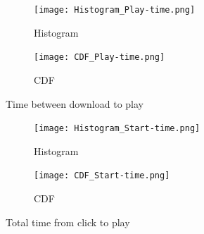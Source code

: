 \begin{figure}
\begin{subfigure}[b]{0.5\textwidth}
 	\texttt{[image: Histogram\_Play-time.png]}
  	\caption{Histogram}\label{fig:histogram3}
    \end{subfigure}\hfill 
    \hspace{3px}
    \begin{subfigure}[b]{0.5\textwidth}
	 \texttt{[image: CDF\_Play-time.png]}
 	\caption{CDF}\label{fig:cdf3}
    \end{subfigure}
	\caption{Time between download to play}
	\label{fig:play-time}
\end{figure}

\begin{figure}
\begin{subfigure}[b]{0.5\textwidth}
 	\texttt{[image: Histogram\_Start-time.png]}
  	\caption{Histogram}\label{fig:histogram4}
    \end{subfigure}\hfill 
    \hspace{3px}
    \begin{subfigure}[b]{0.5\textwidth}
	 \texttt{[image: CDF\_Start-time.png]}
 	\caption{CDF}\label{fig:cdf4}
    \end{subfigure}
	\caption{Total time from click to play}
	\label{fig:start-time}
\end{figure}